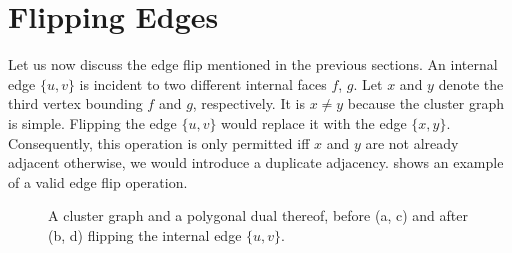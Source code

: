 \section{Flipping Edges}
\label{sect:flipping-edges}

Let us now discuss the edge flip mentioned in the previous sections.
An internal edge $\{u,v\}$ is incident to two different internal faces $f$, $g$.
Let $x$ and $y$ denote the third vertex bounding $f$ and $g$, respectively.
It is $x \neq y$ because the cluster graph is simple.
Flipping the edge $\{u,v\}$ would replace it with the edge $\{x,y\}$.
Consequently, this operation is only permitted iff $x$ and $y$ are not already adjacent \emdash{} otherwise, we would introduce a duplicate adjacency.
 shows an example of a valid edge flip operation.

\begin{figure}[H]
	\centering
	\quad
	\qquad
	\quad
	\caption{A cluster graph and a polygonal dual thereof, before (a, c) and after (b, d) flipping the internal edge $\{u,v\}$.}
	\label{fig:flip-edge-example-internal}
\end{figure}

